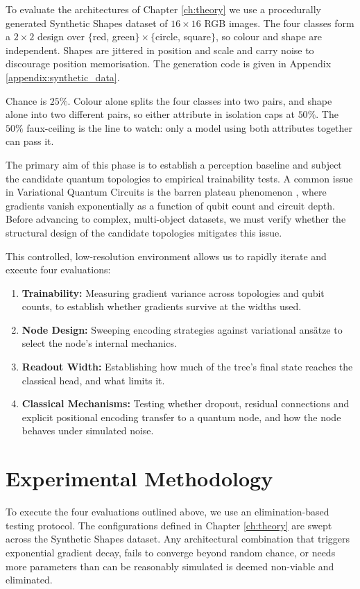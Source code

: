 \documentclass[12pt, a4paper, oneside]{report}
\begin{document}
To evaluate the architectures of Chapter \ref{ch:theory} we use a procedurally generated Synthetic Shapes dataset of $16 \times 16$ RGB images. The four classes form a $2 \times 2$ design over $\{$red, green$\}\times\{$circle, square$\}$, so colour and shape are independent. Shapes are jittered in position and scale and carry noise to discourage position memorisation. The generation code is given in Appendix \ref{appendix:synthetic_data}.

Chance is $25\%$. Colour alone splits the four classes into two pairs, and shape alone into two different pairs, so either attribute in isolation caps at $50\%$. The $50\%$ faux-ceiling is the line to watch: only a model using both attributes together can pass it.

The primary aim of this phase is to establish a perception baseline and subject the candidate quantum topologies to empirical trainability tests. A common issue in Variational Quantum Circuits is the barren plateau phenomenon \cite{barren_plateaus}, where gradients vanish exponentially as a function of qubit count and circuit depth. Before advancing to complex, multi-object datasets, we must verify whether the structural design of the candidate topologies mitigates this issue.

This controlled, low-resolution environment allows us to rapidly iterate and execute four evaluations:
\begin{enumerate}
    \item \textbf{Trainability:} Measuring gradient variance across topologies and qubit counts, to establish whether gradients survive at the widths used.
    \item \textbf{Node Design:} Sweeping encoding strategies against variational ans\"{a}tze to select the node's internal mechanics.
    \item \textbf{Readout Width:} Establishing how much of the tree's final state reaches the classical head, and what limits it.
    \item \textbf{Classical Mechanisms:} Testing whether dropout, residual connections and explicit positional encoding transfer to a quantum node, and how the node behaves under simulated noise.
\end{enumerate}

\section{Experimental Methodology}
To execute the four evaluations outlined above, we use an elimination-based testing protocol. The configurations defined in Chapter \ref{ch:theory} are swept across the Synthetic Shapes dataset. Any architectural combination that triggers exponential gradient decay, fails to converge beyond random chance, or needs more parameters than can be reasonably simulated is deemed non-viable and eliminated.
\end{document}
